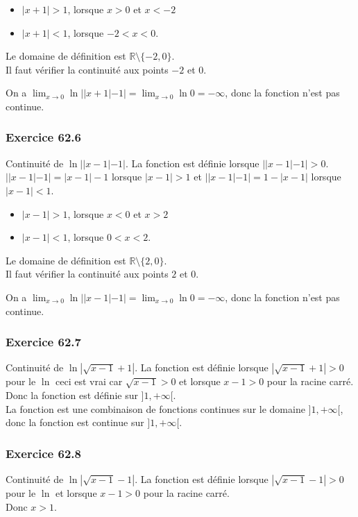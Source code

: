 \documentclass[]{book}
\theoremstyle{definition}
\newcommand{\bb}[1]{\mathbb{#1}}
\newcommand{\R}{\bb{R}}
\begin{document}
\begin{itemize}
\item $|x+1| > 1$, lorsque $x>0$ et $x < -2$
\item $|x+1| < 1$, lorsque $-2<x<0$. 
\end{itemize}

Le domaine de d\'efinition est $\R \setminus \{-2,0\}$.\\
Il faut v\'erifier la continuit\'e aux points $-2$ et $0$.

On a $\lim_{x\to0} \ln ||x+1|-1| = \lim_{x\to0} \ln 0 = -\infty$, donc la fonction n'est pas continue.

\subsubsection*{Exercice 62.6}
Continuit\'e de $\ln||x-1|-1|$. La fonction est d\'efinie lorsque $||x-1|-1| > 0$. \\
$||x-1|-1| = |x-1|-1$ lorsque $|x-1| > 1$ et $||x-1|-1| = 1-|x-1|$ lorsque $|x-1| < 1$. \\

\begin{itemize}
\item $|x-1| > 1$, lorsque $x<0$ et $x > 2$
\item $|x-1| < 1$, lorsque $0<x<2$. 
\end{itemize}

Le domaine de d\'efinition est $\R \setminus \{2,0\}$.\\
Il faut v\'erifier la continuit\'e aux points $2$ et $0$.

On a $\lim_{x\to0} \ln ||x-1|-1| = \lim_{x\to0} \ln 0 = -\infty$, donc la fonction n'est pas continue.


\subsubsection*{Exercice 62.7}
Continuit\'e de $\ln|\sqrt{x-1}+1|$. La fonction est d\'efinie lorsque $|\sqrt{x-1}+1| > 0$ pour le $\ln$ ceci est vrai car $\sqrt{x-1} > 0$ et lorsque $x-1>0$ pour la racine carr\'e. Donc la fonction est d\'efinie sur $]1,+\infty[$.\\
La fonction est une combinaison de fonctions continues sur le domaine  $]1,+\infty[$, donc la fonction est continue sur $]1,+\infty[$.


\subsubsection*{Exercice 62.8}
Continuit\'e de $\ln|\sqrt{x-1}-1|$. La fonction est d\'efinie lorsque $|\sqrt{x-1}-1| > 0$ pour le $\ln$  et lorsque $x-1>0$ pour la racine carr\'e.\\
Donc $x > 1$.
\end{document}

